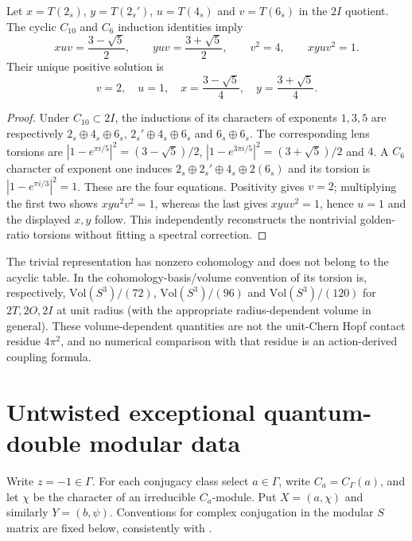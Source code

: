 \documentclass[11pt]{article}
\begin{document}
\begin{proposition}
\label{p1b:prop:v15-icosahedral-induction}
Let $x=T(2_s)$, $y=T(2_s')$, $u=T(4_s)$ and $v=T(6_s)$
in the $2I$ quotient. The cyclic $C_{10}$ and $C_6$ induction
identities imply
\[
 xuv=\frac{3-\sqrt5}{2},\qquad
 yuv=\frac{3+\sqrt5}{2},\qquad
 v^2=4,\qquad xyuv^2=1.
\tag{T15.2}\label{p1b:eq:v15-induction-system}
\]
Their unique positive solution is
\[
\boxed{v=2,\quad u=1,\quad
x=\frac{3-\sqrt5}{4},\quad
 y=\frac{3+\sqrt5}{4}.}
\tag{T15.3}\label{p1b:eq:v15-induction-result}
\]
\end{proposition}
\begin{proof}
Under $C_{10}\subset2I$, the inductions of its characters of
exponents $1,3,5$ are respectively
$2_s\oplus4_s\oplus6_s$,
$2_s'\oplus4_s\oplus6_s$ and $6_s\oplus6_s$.
The corresponding lens torsions are
$|1-e^{\pi i/5}|^2=(3-\sqrt5)/2$,
$|1-e^{3\pi i/5}|^2=(3+\sqrt5)/2$ and $4$.
A $C_6$ character of exponent one induces
$2_s\oplus 2_s'\oplus4_s\oplus2(6_s)$ and its torsion is
$|1-e^{\pi i/3}|^2=1$.
These are the four equations. Positivity gives $v=2$;
multiplying the first two shows $xyu^2v^2=1$, whereas the last
gives $xyuv^2=1$, hence $u=1$ and the displayed $x,y$ follow.
This independently reconstructs the nontrivial golden-ratio torsions
without fitting a spectral correction.
\end{proof}

\begin{remark}
\label{p1b:rem:v15-trivial-torsion}
The trivial representation has nonzero cohomology and does not belong to
the acyclic table. In the cohomology-basis/volume convention of
\cite{DowkerChang2009AnalyticTorsion} its torsion is, respectively,
$\mathrm{Vol}(S^3)/(72)$, $\mathrm{Vol}(S^3)/(96)$ and
$\mathrm{Vol}(S^3)/(120)$ for $2T,2O,2I$ at unit radius
(with the appropriate radius-dependent volume in general).
These volume-dependent quantities are not the unit-Chern Hopf contact
residue $4\pi^2$, and no numerical comparison with that residue is
an action-derived coupling formula.
\end{remark}

\section{Untwisted exceptional quantum-double modular data}
\label{p1b:sec:v15-modular-calculus}
Write $z=-1\in\Gamma$. For each conjugacy class select $a\in\Gamma$,
write $C_a=C_\Gamma(a)$, and let $\chi$ be the character of an
irreducible $C_a$-module. Put $X=(a,\chi)$ and similarly
$Y=(b,\psi)$. Conventions for complex conjugation in the modular
$S$ matrix are fixed below, consistently with
\cite{CoquereauxZuber2013Doubles}.
\end{document}
